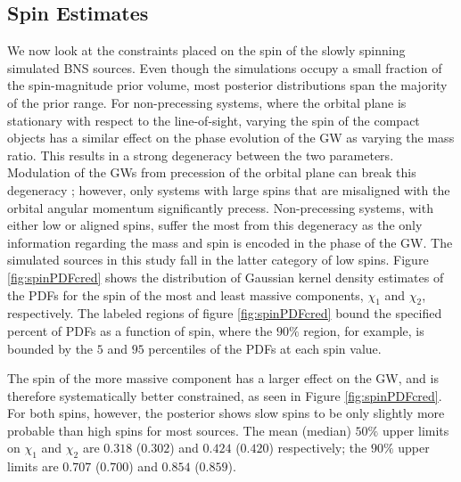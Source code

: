 \subsection{Spin Estimates}\label{sec:spin-magnitudes}
We now look at the constraints placed on the spin of the slowly spinning simulated BNS sources.  Even though the simulations occupy a small fraction of the spin-magnitude prior volume, most posterior distributions span the majority of the prior range. For non-precessing systems, where the orbital plane is stationary with respect to the line-of-sight, varying the spin of the compact objects has a similar effect on the phase evolution of the GW as varying the mass ratio. This results in a strong degeneracy between the two parameters.  Modulation of the GWs from precession of the orbital plane can break this degeneracy \citep{Vecchio_2004,Lang_2006,Vitale_2014,Chatziioannou_2014}; however, only systems with large spins that are misaligned with the orbital angular momentum significantly precess. Non-precessing systems, with either low or aligned spins, suffer the most from this degeneracy as the only information regarding the mass and spin is encoded in the phase of the GW.  The simulated sources in this study fall in the latter category of low spins.  Figure  \ref{fig:spinPDFcred} shows the distribution of Gaussian kernel density estimates of the PDFs for the spin of the most and least massive components, $\chi_1$ and $\chi_2$, respectively.  The labeled regions of figure \ref{fig:spinPDFcred} bound the specified percent of PDFs as a function of spin, where the $90\%$ region, for example, is bounded by the $5$ and $95$ percentiles of the PDFs at each spin value. 

The spin of the more massive component has a larger effect on the GW, and is therefore systematically better constrained, as seen in Figure \ref{fig:spinPDFcred}.  For both spins, however, the posterior shows slow spins to be only slightly more probable than high spins for most sources. The mean (median) $50\%$ upper limits on $\chi_1$ and $\chi_2$ are $0.318$ ($0.302$) and $0.424$ ($0.420$) respectively; the $90\%$ upper limits are $0.707$ ($0.700$) and $0.854$ ($0.859$).
  
  
  
  
  
  
  
  
  
  